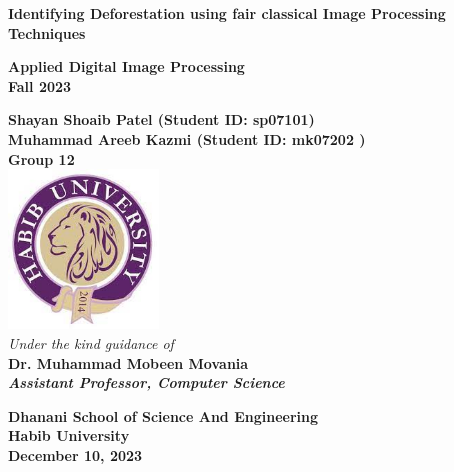 \documentclass[12pt,a4paper,IEEEtran]{article}
\begin{document}
	\begin{center}
		\begin{LARGE}			\bf{Identifying Deforestation using fair classical Image Processing Techniques\\}
		\end{LARGE}
		\vspace*{30pt}
		\textbf{Applied Digital Image Processing \\ Fall 2023}
		\vspace{40pt}
		
		\textbf{
			Shayan Shoaib Patel (Student ID: sp07101)\\
			Muhammad Areeb Kazmi (Student ID: mk07202 )\\
            Group 12}\\

		\vspace{30pt}
		\includegraphics[width=0.3\textwidth]{./logo.png} \\
		\vspace{30pt}
		\textit{Under the kind guidance of}\\
		\textbf{Dr. Muhammad Mobeen Movania}\\
		\textit{\textbf{Assistant Professor, Computer Science}}
		
		
		\vspace{20pt}
		
		
		\textbf{Dhanani School of Science And Engineering\\
			Habib University\\
			December 10, 2023
		}
	\end{center}




\end{document}

